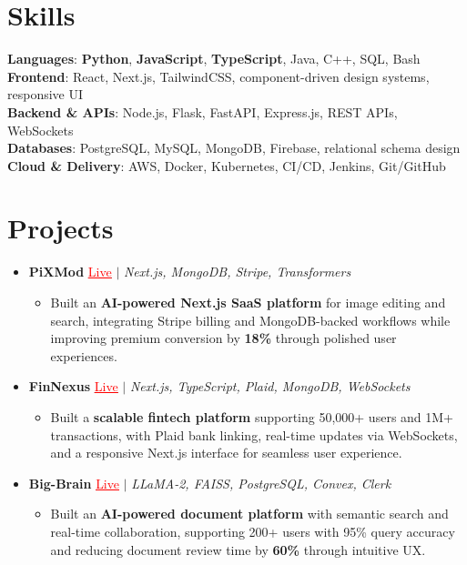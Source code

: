 \documentclass[letterpaper,10pt]{article}
\newcommand{\resumeItem}[1]{\item\small{{#1 \vspace{-2pt}}}}
\newcommand{\resumeProjectHeading}[1]{\item \small #1 \vspace{-2pt}}
\newcommand{\resumeSubHeadingListStart}{\begin{itemize}[leftmargin=0.0in, label={}]}
\newcommand{\resumeSubHeadingListEnd}{\end{itemize}}
\newcommand{\resumeProjItemListStart}{\begin{itemize}[leftmargin=0.15in,label=\textbullet,itemsep=0pt,topsep=0pt,parsep=0pt,partopsep=0pt]}
\newcommand{\resumeProjItemListEnd}{\end{itemize}\vspace{-4pt}}
\begin{document}
\section{Skills}
\begin{itemize}[leftmargin=0.15in, label={}]
\small{\item{
\textbf{Languages}: \textbf{Python}, \textbf{JavaScript}, \textbf{TypeScript}, Java, C++, SQL, Bash \\
\textbf{Frontend}: React, Next.js, TailwindCSS, component-driven design systems, responsive UI \\
\textbf{Backend \& APIs}: Node.js, Flask, FastAPI, Express.js, REST APIs, WebSockets \\
\textbf{Databases}: PostgreSQL, MySQL, MongoDB, Firebase, relational schema design \\
\textbf{Cloud \& Delivery}: AWS, Docker, Kubernetes, CI/CD, Jenkins, Git/GitHub
}}
\end{itemize}
\vspace{-16pt}
\section{Projects}
\resumeSubHeadingListStart
\vspace{-2pt}
\resumeProjectHeading{\textbf{PiXMod} {\href{https://pixmod.vercel.app/}{\textcolor{red}{\underline{Live}}}} $|$ \emph{Next.js, MongoDB, Stripe, Transformers}}
\resumeProjItemListStart
\resumeItem{Built an \textbf{AI-powered Next.js SaaS platform} for image editing and search, integrating Stripe billing and MongoDB-backed workflows while improving premium conversion by \textbf{18\%} through polished user experiences.}
\resumeProjItemListEnd
\vspace{3pt}
\resumeProjectHeading{\textbf{FinNexus} {\href{https://fin-nexus.vercel.app/}{\textcolor{red}{\underline{Live}}}} $|$ \emph{Next.js, TypeScript, Plaid, MongoDB, WebSockets}}
\resumeProjItemListStart
\resumeItem{Built a \textbf{scalable fintech platform} supporting 50,000+ users and 1M+ transactions, with Plaid bank linking, real-time updates via WebSockets, and a responsive Next.js interface for seamless user experience.}
\resumeProjItemListEnd
\vspace{3pt}
\resumeProjectHeading{\textbf{Big-Brain} {\href{https://big-brain-pied.vercel.app/}{\textcolor{red}{\underline{Live}}}} $|$ \emph{LLaMA-2, FAISS, PostgreSQL, Convex, Clerk}}
\resumeProjItemListStart
\resumeItem{Built an \textbf{AI-powered document platform} with semantic search and real-time collaboration, supporting 200+ users with 95\% query accuracy and reducing document review time by \textbf{60\%} through intuitive UX.}
\resumeProjItemListEnd
\resumeSubHeadingListEnd
\end{document}
